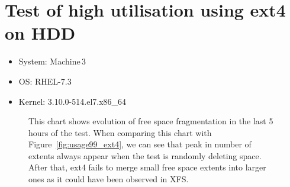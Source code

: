 \documentclass[
  color, %
  table, %
  lof,   %
  lot,   %
]{fithesis3}
\begin{document}
\section{Test of high utilisation using ext4 on HDD}
\begin{itemize}
\itemsep0em 
   \item System: Machine\,3
   \item OS: RHEL-7.3
   \item Kernel: 3.10.0-514.el7.x86\_64
\end{itemize}

\begin{figure}[h]
    \centering
    \caption[Evolution of free space fragmentation of ext4 during testing of high utilisation of HDD]{This chart shows evolution of free space fragmentation in the last 5 hours of the test. When comparing this chart with Figure~\ref{fig:usage99_ext4}, we can see that peak in number of extents always appear when the test is randomly deleting space. After that, ext4 fails to merge small free space extents into larger ones as it could have been observed in XFS.}
    \label{fig:free99_ext4}
\end{figure}
\end{document}
